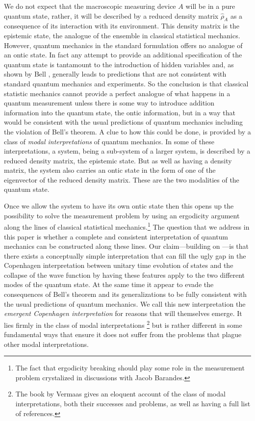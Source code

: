 \documentclass[%
preprint,
nofootinbib,
 amsmath,amssymb,
aps,
]{revtex4-1}
\begin{document}
We do not expect that the macroscopic measuring device $A$ will be in a pure quantum state, rather, it will be described by a reduced density matrix $\hat\rho_A$ as a consequence of its interaction with its environment. This density matrix is the epistemic state, the analogue of the ensemble in classical statistical mechanics. However, quantum mechanics in the standard formulation offers no analogue of an ontic state. In fact
any attempt to provide an additional specification of the quantum state is tantamount to the introduction of hidden variables and, as shown by Bell \cite{Bell:1964oeprp}, generally leads to
predictions that are not consistent with standard quantum mechanics and experiments.
So the conclusion is that classical statistic mechanics cannot provide a perfect analogue of what happens in a quantum measurement unless there is some way to introduce addition information into the quantum state, the ontic information, but in a way that would be consistent with the usual predictions of quantum mechanics including the violation of Bell's theorem.
A clue to how this could be done, is provided by a class of {\it modal interpretations\/} of quantum mechanics. In some of these interpretations, a system, being a sub-system of a larger system, is described by a reduced density matrix, the epistemic state. But as well as having a density matrix, the system also carries an ontic state in the form of one of the eigenvector of the reduced density matrix. These are the two modalities of the quantum state.

Once we allow the system to have its own ontic state then this opens up the possibility to solve the measurement problem by using an ergodicity argument along the lines of classical statistical mechanics.\footnote{The fact that ergodicity breaking should play some role in the measurement 
problem crystalized in discussions with Jacob Barandes.} The question that we address in this paper is whether a complete and consistent interpretation of quantum mechanics can be constructed along these lines. Our claim---building on \cite{Hollowood:2013cbr}---is that there exists a conceptually simple interpretation that can  
fill the ugly gap in the Copenhagen interpretation between unitary time evolution of states and the collapse of the wave function by having these features apply to the two different modes of the quantum state.
At the same time it appear to evade the consequences of Bell's theorem and its generalizations to be fully consistent with the usual predictions of quantum mechanics.
We call this new interpretation the {\it emergent Copenhagen interpretation\/} for reasons that will themselves emerge. It lies firmly in the class of modal interpretations \cite{Krips:1969tpqm,Krips:1975siqt,Krips:1987mqt,vanFraassen:1972faps,Cartwright:1974vfmmqm,Krips:1987mqt,vanFraassen:1991qmmv,Bub:1992qmwpp,VermaasDieks:1995miqmgdo,BacciagaluppiDickson:1999dmi}\footnote{The book by Vermaas \cite{Vermaas:1999puqm} gives an eloquent account of the class of modal interpretations, both their successes and problems, as well as having a full list of references.} but is rather different in some fundamental ways that ensure it does not suffer from the problems that plague other modal interpretations.
\end{document}
